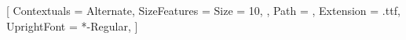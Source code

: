 \usepackage{fontspec}

\setmonofont{FiraCode}[
    Contextuals = Alternate,
	SizeFeatures = {
	    Size = 10,
    },
	Path = \fonts,
	Extension = .ttf,
    UprightFont = *-Regular,
]

\usepackage[verbatim]{lstfiracode}
